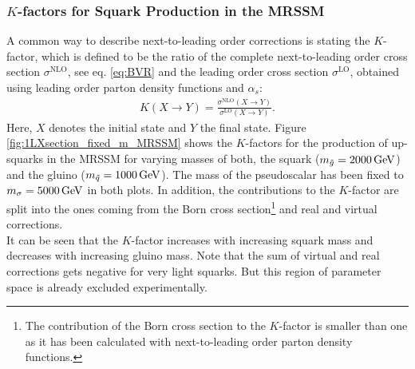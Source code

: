 \subsubsection{$K$-factors for Squark Production in the MRSSM}
A common way to describe next-to-leading order corrections is stating the $K$-factor, which is defined to be the ratio of the complete next-to-leading order cross section $\sigma^{\mathrm{NLO}}$, see eq. \eqref{eq:BVR} and the leading order cross section $\sigma^{\mathrm{LO}}$, obtained using leading order parton density functions and $\alpha_s$:
\begin{align}
K(X \to Y) = \frac{\sigma^{\mathrm{NLO}}(X \to Y)}{\sigma^{\mathrm{LO}}(X \to Y)}.
\end{align}
Here, $X$ denotes the initial state and $Y$ the final state.
Figure \ref{fig:1LXsection_fixed_m_MRSSM} shows the $K$-factors for the production of up-squarks in the MRSSM for varying masses of both, the squark \mbox{($m_{\tilde{g}} = \unit[2000]{GeV}$)} and the gluino ($m_{\tilde{q}} = \unit[1000]{GeV}$). The mass of the pseudoscalar has been fixed to $m_{\sigma} = \unit[5000]{GeV}$ in both plots.
In addition, the contributions to the $K$-factor are split into the ones coming from the Born cross section\footnote{The contribution of the Born cross section to the $K$-factor is smaller than one as it has been calculated with next-to-leading order parton density functions.} and real and virtual corrections.\\
It can be seen that the  $K$-factor increases with increasing squark mass and decreases with increasing gluino mass. Note that the sum of virtual and real corrections gets negative for very light squarks. But this region of parameter space is already excluded experimentally.
